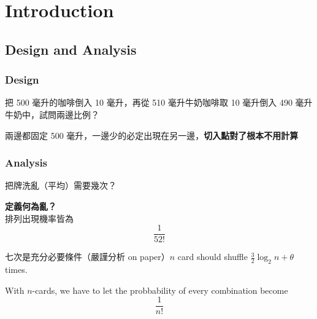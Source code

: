 \chapter{Introduction}

\section{Design and Analysis}

\subsection{Design}

\begin{remark}
\end{remark}
\begin{exercise}
        把 500 毫升的咖啡倒入 10 毫升，再從 510 毫升牛奶咖啡取 10 毫升倒入 490 毫升牛奶中，試問兩邊比例？
\end{exercise}
\begin{answer} 
    兩邊都固定 500 毫升，一邊少的必定出現在另一邊，\textbf{切入點對了根本不用計算}
\end{answer}

\subsection{Analysis}

\begin{exercise}[Card]
        把牌洗亂（平均）需要幾次？
\end{exercise}
\begin{answer}
    \begin{note}
        \textbf{定義何為亂？}\\
        排列出現機率皆為
        \[
        \frac{1}{52!}
        \]
    \end{note}
        七次是充分必要條件（嚴謹分析 on paper）$n$ card should shuffle $\frac{3}{2}\log_2 n + \theta$ times.
\end{answer}

\begin{definition}[亂]
    With $n$-cards, we have to let the probbability of every combination become 
    \[
    \frac{1}{n!}
    \]
\end{definition}

\newpage

